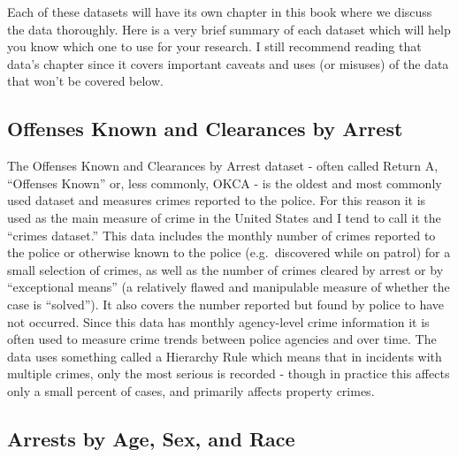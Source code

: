 \documentclass[
  12pt,
  openany]{book}
\begin{document}
Each of these datasets will have its own chapter in this book where we discuss the data thoroughly. Here is a very brief summary of each dataset which will help you know which one to use for your research. I still recommend reading that data's chapter since it covers important caveats and uses (or misuses) of the data that won't be covered below.

\hypertarget{offenses-known-and-clearances-by-arrest}{%
\subsection{Offenses Known and Clearances by Arrest}\label{offenses-known-and-clearances-by-arrest}}

The Offenses Known and Clearances by Arrest dataset - often called Return A, ``Offenses Known'' or, less commonly, OKCA - is the oldest and most commonly used dataset and measures crimes reported to the police. For this reason it is used as the main measure of crime in the United States and I tend to call it the ``crimes dataset.'' This data includes the monthly number of crimes reported to the police or otherwise known to the police (e.g.~discovered while on patrol) for a small selection of crimes, as well as the number of crimes cleared by arrest or by ``exceptional means'' (a relatively flawed and manipulable measure of whether the case is ``solved''). It also covers the number reported but found by police to have not occurred. Since this data has monthly agency-level crime information it is often used to measure crime trends between police agencies and over time. The data uses something called a Hierarchy Rule which means that in incidents with multiple crimes, only the most serious is recorded - though in practice this affects only a small percent of cases, and primarily affects property crimes.

\hypertarget{arrests-by-age-sex-and-race}{%
\subsection{Arrests by Age, Sex, and Race}\label{arrests-by-age-sex-and-race}}
\end{document}
